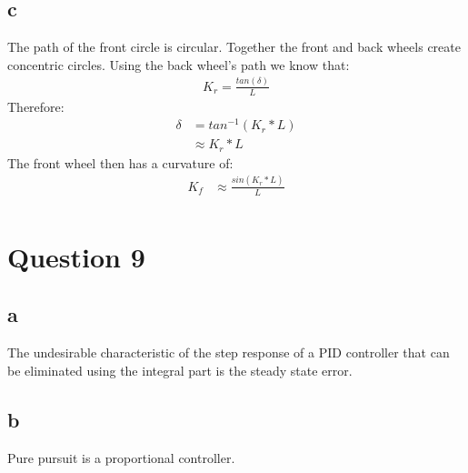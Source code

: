 \documentclass[12pt]{article}
\begin{document}
\subsection{c}
The path of the front circle is circular.
Together the front and back wheels create concentric circles.
Using the back wheel's path we know that:
\begin{align*}
    K_r = \frac{tan(\delta)}{L}
\end{align*}
Therefore:
\begin{align*}
    \delta & = tan^{-1}(K_r*L) \\
           & \approx K_r*L
\end{align*}
The front wheel then has a curvature of:
\begin{align*}
    K_{f} & \approx \frac{sin(K_r*L)}{L} \\
\end{align*}

\section{Question 9}
\subsection{a}
The undesirable characteristic of the step response of a PID controller that can be eliminated using the integral part is the steady state error.
\subsection{b}
Pure pursuit is a proportional controller.

\end{document}
